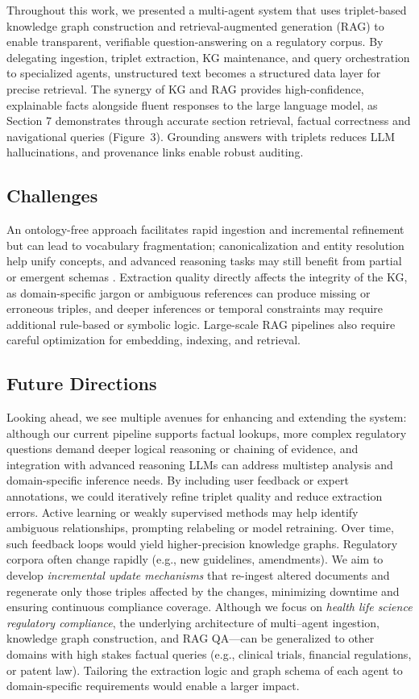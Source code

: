 \documentclass{article}
\begin{document}
Throughout this work, we presented a multi-agent system that uses triplet-based knowledge graph construction and retrieval-augmented generation (RAG) to enable transparent, verifiable question-answering on a regulatory corpus. By delegating ingestion, triplet extraction, KG maintenance, and query orchestration to specialized agents, unstructured text becomes a structured data layer for precise retrieval. The synergy of KG and RAG provides high-confidence, explainable facts alongside fluent responses to the large language model, as Section 7 demonstrates through accurate section retrieval, factual correctness and navigational queries (Figure~3). Grounding answers with triplets reduces LLM hallucinations, and provenance links enable robust auditing.

\subsection{Challenges}
An ontology-free approach facilitates rapid ingestion and incremental refinement but can lead to vocabulary fragmentation; canonicalization and entity resolution \cite{galarraga2014canonicalizing, shen2014entity} help unify concepts, and advanced reasoning tasks may still benefit from partial or emergent schemas \cite{riedel2013relation}. Extraction quality directly affects the integrity of the KG, as domain-specific jargon or ambiguous references can produce missing or erroneous triples, and deeper inferences or temporal constraints may require additional rule-based or symbolic logic. Large-scale RAG pipelines also require careful optimization for embedding, indexing, and retrieval.

\subsection{Future Directions}
Looking ahead, we see multiple avenues for enhancing and extending the system: although our current pipeline supports factual lookups, more complex regulatory questions demand deeper logical reasoning or chaining of evidence, and integration with advanced reasoning LLMs can address multistep analysis and domain-specific inference needs. 
By including user feedback or expert annotations, we could iteratively refine triplet quality and reduce extraction errors. Active learning or weakly supervised methods may help identify ambiguous relationships, prompting relabeling or model retraining. Over time, such feedback loops would yield higher-precision knowledge graphs.
Regulatory corpora often change rapidly (e.g., new guidelines, amendments). We aim to develop \emph{incremental update mechanisms} that re-ingest altered documents and regenerate only those triples affected by the changes, minimizing downtime and ensuring continuous compliance coverage.
Although we focus on \emph{health life science regulatory compliance}, the underlying architecture of multi--agent ingestion, knowledge graph construction, and RAG QA---can be generalized to other domains with high stakes factual queries (e.g., clinical trials, financial regulations, or patent law). Tailoring the extraction logic and graph schema of each agent to domain-specific requirements would enable a larger impact.






\end{document}

